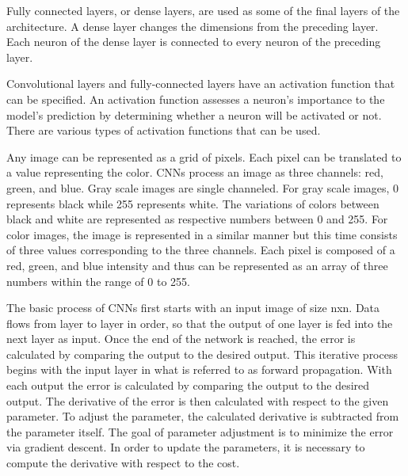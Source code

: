 \documentclass[10pt,twocolumn]{article}
\begin{document}
Fully connected layers, or dense layers, are used as some of the final layers of the architecture. A dense layer changes the dimensions from the preceding layer. Each neuron of the dense layer is connected to every neuron of the preceding layer. 

Convolutional layers and fully-connected layers have an activation function that can be specified. An activation function assesses a neuron’s importance to the model’s prediction by determining whether a neuron will be activated or not. There are various types of activation functions that can be used.

Any image can be represented as a grid of pixels. Each pixel can be translated to a value representing the color. CNNs process an image as three channels: red, green, and blue. Gray scale images are single channeled. For gray scale images, 0 represents black while 255 represents white. The variations of colors between black and white are represented as respective numbers between 0 and 255. For color images, the image is represented in a similar manner but this time consists of three values corresponding to the three channels. Each pixel is composed of a red, green, and blue intensity and thus can be represented as an array of three numbers within the range of 0 to 255. 

The basic process of CNNs first starts with an input image of size nxn. Data flows from layer to layer in order, so that the output of one layer is fed into the next layer as input. Once the end of the network is reached, the error is calculated by comparing the output to the desired output. This iterative process begins with the input layer in what is referred to as forward propagation. With each output the error is calculated by comparing the output to the desired output. The derivative of the error is then calculated with respect to the given parameter. To adjust the parameter, the calculated derivative is subtracted from the parameter itself. The goal of parameter adjustment is to minimize the error via gradient descent. In order to update the parameters, it is necessary to compute the derivative with respect to the cost. 
\end{document}
